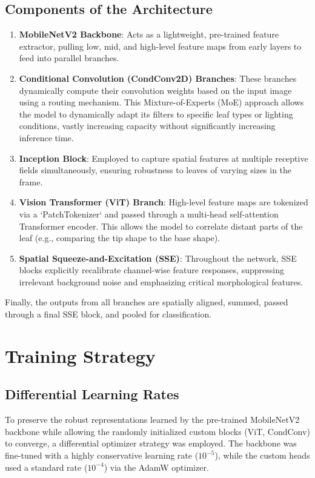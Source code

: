 \documentclass[12pt,a4paper]{article}
\begin{document}
\subsection{Components of the Architecture}
\begin{enumerate}
    \item \textbf{MobileNetV2 Backbone}: Acts as a lightweight, pre-trained feature extractor, pulling low, mid, and high-level feature maps from early layers to feed into parallel branches.
    \item \textbf{Conditional Convolution (CondConv2D) Branches}: These branches dynamically compute their convolution weights based on the input image using a routing mechanism. This Mixture-of-Experts (MoE) approach allows the model to dynamically adapt its filters to specific leaf types or lighting conditions, vastly increasing capacity without significantly increasing inference time.
    \item \textbf{Inception Block}: Employed to capture spatial features at multiple receptive fields simultaneously, ensuring robustness to leaves of varying sizes in the frame.
    \item \textbf{Vision Transformer (ViT) Branch}: High-level feature maps are tokenized via a `PatchTokenizer` and passed through a multi-head self-attention Transformer encoder. This allows the model to correlate distant parts of the leaf (e.g., comparing the tip shape to the base shape).
    \item \textbf{Spatial Squeeze-and-Excitation (SSE)}: Throughout the network, SSE blocks explicitly recalibrate channel-wise feature responses, suppressing irrelevant background noise and emphasizing critical morphological features.
\end{enumerate}
Finally, the outputs from all branches are spatially aligned, summed, passed through a final SSE block, and pooled for classification.

\section{Training Strategy}
\subsection{Differential Learning Rates}
To preserve the robust representations learned by the pre-trained MobileNetV2 backbone while allowing the randomly initialized custom blocks (ViT, CondConv) to converge, a differential optimizer strategy was employed. The backbone was fine-tuned with a highly conservative learning rate ($10^{-5}$), while the custom heads used a standard rate ($10^{-4}$) via the AdamW optimizer.
\end{document}
